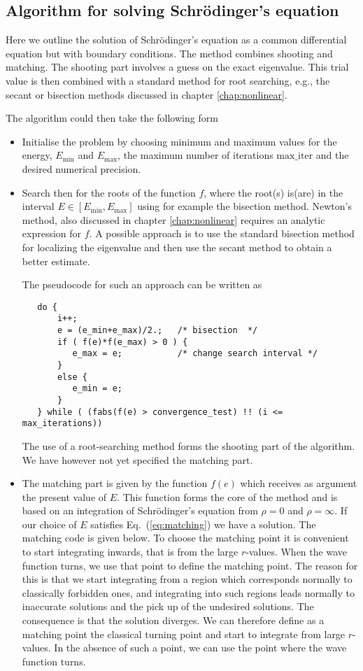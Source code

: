 \subsection{Algorithm for solving Schr\"odinger's equation}


Here we outline  the solution of 
Schr\"odinger's equation as a common differential equation 
but with boundary conditions. The method combines
shooting and matching. The shooting part involves a guess on the  
exact eigenvalue. This trial value is then combined with a standard method
for root searching, e.g., the secant or bisection 
methods discussed in chapter \ref{chap:nonlinear}.

The algorithm could then take the following form
\begin{itemize}
\item Initialise the problem by choosing  
minimum and maximum values for the energy, 
$E_{\mathrm{min}}$ and  $E_{\mathrm{max}}$, the maximum number of
iterations $\mathrm{max\_iter}$ and the desired numerical precision.
\item Search then for the roots of the function $f$, where the root(s)
is(are) in the interval $E \in [E_{\mathrm{min}},E_{\mathrm{max}}]$
using for example the bisection method.
Newton's method, also discussed in chapter \ref{chap:nonlinear} requires an analytic
expression for $f$.  A possible approach is to use the standard bisection method
for localizing the eigenvalue and then use the secant method to obtain a better estimate.

The pseudocode for such an approach can be written as
\begin{lstlisting}
   do {
       i++;
       e = (e_min+e_max)/2.;   /* bisection  */
       if ( f(e)*f(e_max) > 0 ) {
          e_max = e;           /* change search interval */ 
       }  
       else {
          e_min = e;
       }
   } while ( (fabs(f(e) > convergence_test) !! (i <= max_iterations))
\end{lstlisting}
The use of a root-searching method forms the shooting part of the 
algorithm. We have however not yet specified the matching part.
\item The matching part is given by the function $f(e)$ which 
receives as argument the present value of $E$. This function
forms the core of the method and is based on an integration 
of Schr\"odinger's equation from $\rho = 0$ and $\rho = \infty$.
If our choice of $E$ satisfies Eq.~(\ref{eq:matching}) we have a
solution. The matching code is given below.
To choose the matching point it is convenient to start integrating inwards, that is
from the large $r$-values.  When the wave function turns, we use that point to define the
matching point. The reason for this is that we start integrating from a region which corresponds
normally to classically forbidden ones, and integrating into such regions leads normally
to inaccurate solutions and the pick up of the undesired solutions. The consequence is that
the solution diverges. We can therefore define as a matching point the classical turning point
and start to integrate from large $r$-values. In the absence of such a point, we can use
the point where the wave function turns.
\end{itemize}

